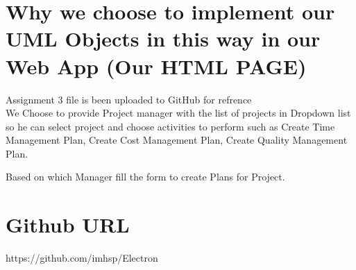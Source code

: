 \documentclass{article}
\begin{document}
\section {Why we choose to implement our UML Objects in this way in our Web App (Our HTML PAGE)}

Assignment 3 file is been uploaded to GitHub for refrence\\

We Choose to provide Project manager with the list of projects in Dropdown list so he can select project and choose activities to perform such as Create Time Management Plan, Create Cost Management Plan, Create Quality Management Plan.

Based on which Manager fill the form to create Plans for Project.


\section{Github URL}
https://github.com/imhsp/Electron
\end{document}
